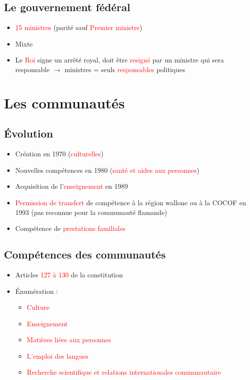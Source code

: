\subsection{Le gouvernement fédéral}
\begin{itemize}
	\item \textcolor{red}{15 ministres} (parité sauf \textcolor{red}{Premier ministre})
	\item Mixte
	\item Le \textcolor{red}{Roi} signe un arrêté royal, doit être \textcolor{red}{resigné} par un ministre qui sera responsable $\rightarrow$ ministres = seuls \textcolor{red}{responsables} politiques 
\end{itemize}

\section{Les communautés}
\subsection{Évolution}
\begin{itemize}
	\item Création en 1970 (\textcolor{red}{culturelles})
	\item Nouvelles compétences en 1980 (\textcolor{red}{santé et aides aux personnes})
	\item Acquisition de l'\textcolor{red}{enseignement} en 1989
	\item \textcolor{red}{Permission de transfert} de compétence à la région wallone ou à la COCOF en 1993 (pas reconnue pour la communauté flamande)
	\item Compétence de \textcolor{red}{prestations familiales}
\end{itemize}

\subsection{Compétences des communautés}
\begin{itemize}
	\item Articles \textcolor{red}{127 à 130} de la constitution
	\item Énumération :
	\begin{itemize}
		\item \textcolor{red}{Culture}
		\item \textcolor{red}{Enseignement}
		\item \textcolor{red}{Matières liées aux personnes}
		\item \textcolor{red}{L'emploi des langues}
		\item \textcolor{red}{Recherche scientifique et relations internationales communautaire}
	\end{itemize}
\end{itemize}


